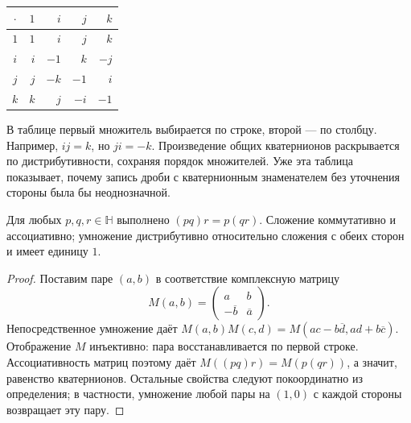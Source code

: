 \begin{center}\renewcommand{\arraystretch}{1.25}
\begin{tabular}{c|rrrr}
\(\cdot\)&\(1\)&\(i\)&\(j\)&\(k\)\\\hline
\(1\)&\(1\)&\(i\)&\(j\)&\(k\)\\
\(i\)&\(i\)&\(-1\)&\(k\)&\(-j\)\\
\(j\)&\(j\)&\(-k\)&\(-1\)&\(i\)\\
\(k\)&\(k\)&\(j\)&\(-i\)&\(-1\)
\end{tabular}\end{center}
В таблице первый множитель выбирается по строке, второй — по столбцу. Например, \(ij=k\), но \(ji=-k\). Произведение общих кватернионов раскрывается по дистрибутивности, сохраняя порядок множителей. Уже эта таблица показывает, почему запись дроби с кватернионным знаменателем без уточнения стороны была бы неоднозначной.

\begin{theorem}\label{thm:legacy-c24-1}
Для любых \(p,q,r\in\mathbb H\) выполнено \((pq)r=p(qr)\). Сложение коммутативно и ассоциативно; умножение дистрибутивно относительно сложения с обеих сторон и имеет единицу \(1\).
\end{theorem}
\begin{proof}
Поставим паре \((a,b)\) в соответствие комплексную матрицу
\[
M(a,b)=\begin{pmatrix}a&b\\-\overline b&\overline a\end{pmatrix}.
\]
Непосредственное умножение даёт \(M(a,b)M(c,d)=M(ac-b\overline d,ad+b\overline c)\). Отображение \(M\) инъективно: пара восстанавливается по первой строке. Ассоциативность матриц поэтому даёт \(M((pq)r)=M(p(qr))\), а значит, равенство кватернионов. Остальные свойства следуют покоординатно из определения; в частности, умножение любой пары на \((1,0)\) с каждой стороны возвращает эту пару.
\end{proof}

